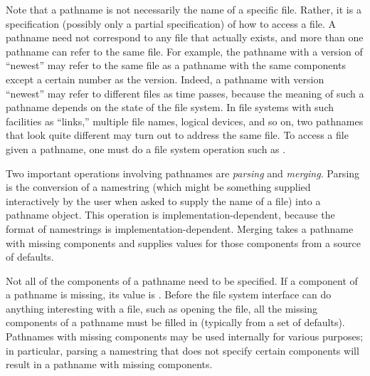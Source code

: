 Note that a pathname is not necessarily the name of a specific file.
Rather, it is a specification (possibly only a partial specification) of
how to access a file.  A pathname need not correspond to any file that
actually exists, and more than one pathname can refer to the same file.
For example, the pathname with a version of ``newest'' may refer to the
same file as a pathname with the same components except a certain number
as the version.  Indeed, a pathname with version ``newest'' may refer to
different files as time passes, because the meaning of such a pathname
depends on the state of the file system.  In file systems with such
facilities as ``links,'' multiple file names, logical devices, and so on,
two pathnames that look quite different may turn out to address the same
file.  To access a file given a pathname, one must do a file system
operation such as
.

Two important operations involving pathnames are \emph{parsing} and
\emph{merging}.  Parsing is the conversion of a namestring (which might be
something supplied interactively by the user when asked to supply the
name of a file) into a pathname object.  This operation is
implementation-dependent, because the format of namestrings
is implementation-dependent.
Merging takes a pathname with missing components
and supplies values for those components from a source of defaults.

Not all of the components of a pathname need to be specified.  If a
component of a pathname is missing, its value is {\nil}.  Before the file
system interface can do anything interesting with a file, such as opening the
file, all the missing components of a pathname must be filled in
(typically from a set of defaults).  Pathnames with missing components
may be used internally for various purposes;
in particular, parsing a namestring
that does not specify certain components will result in a pathname with
missing components.

